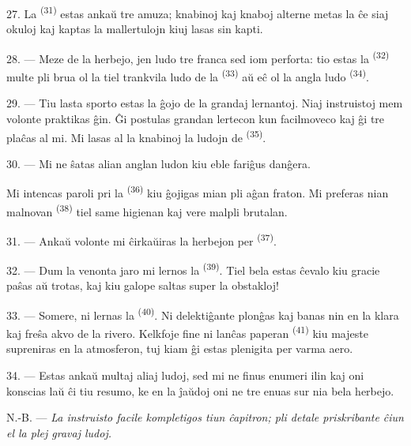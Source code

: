 27. La  \textsuperscript{(31)} estas ankaŭ tre amuza;
knabinoj kaj knaboj alterne metas la  ĉe siaj okuloj kaj
kaptas la mallertulojn kiuj lasas sin kapti.

28. --- Meze de la herbejo, jen ludo tre franca sed iom perforta: tio estas
la  \textsuperscript{(32)} multe pli brua ol la tiel trankvila
ludo de la  \textsuperscript{(33)} aŭ eĉ ol la angla ludo
 \textsuperscript{(34)}.

29. --- Tiu lasta sporto estas la ĝojo de la grandaj lernantoj. Niaj
instruistoj mem volonte praktikas ĝin. Ĝi postulas grandan lertecon kun
facilmoveco kaj ĝi tre plaĉas al mi. Mi lasas al la knabinoj la ludojn de
 \textsuperscript{(35)}.

30. --- Mi ne ŝatas alian anglan ludon kiu eble fariĝus danĝera.

Mi intencas paroli pri la  \textsuperscript{(36)} kiu
ĝojigas mian pli aĝan fraton. Mi preferas nian malnovan 
\textsuperscript{(38)} tiel same higienan kaj vere malpli brutalan.

\VUsaut{4.6mm}
\VUsaut{3.0mm}

31. --- Ankaŭ volonte mi ĉirkaŭiras la herbejon per 
\textsuperscript{(37)}.

32. --- Dum la venonta jaro mi lernos la 
\textsuperscript{(39)}. Tiel bela estas ĉevalo kiu gracie paŝas aŭ trotas, kaj
kiu galope saltas super la obstakloj!

33. --- Somere, ni lernas la  \textsuperscript{(40)}. Ni
delektiĝante plonĝas kaj banas nin en la klara kaj freŝa akvo de la rivero.
Kelkfoje fine ni lanĉas paperan  \textsuperscript{(41)} kiu
majeste supreniras en la atmosferon, tuj kiam ĝi estas plenigita per varma
aero.

34. --- Estas ankaŭ multaj aliaj ludoj, sed mi ne finus enumeri ilin kaj oni
konscias laŭ ĉi tiu resumo, ke en la ĵaŭdoj oni ne tre enuas sur nia bela
herbejo.

N.-B. --- \textit{La instruisto facile kompletigos tiun ĉapitron; pli detale
priskribante ĉiun el la plej gravaj ludoj.}
\VUsaut{6.0mm}
\VUfilet{22mm}
